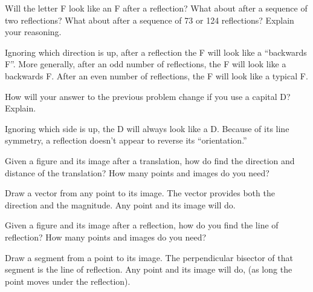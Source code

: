 \documentclass[nooutcomes]{ximera}
\begin{document}
\begin{question}
Will the letter F look like an F after a reflection?  What about after a sequence of two reflections?  What about after a sequence of 73 or 124 reflections?  Explain your reasoning.  
\begin{freeResponse}
\begin{hint}
Ignoring which direction is up, after a reflection the F will look like a ``backwards F''.  More generally, after an odd number of reflections, the F will look like a backwards F.  After an even number of reflections, the F will look like a typical F.  
\end{hint}
\end{freeResponse}
\end{question}

\begin{question}
How will your answer to the previous problem change if you use a capital D?  Explain.  
\begin{freeResponse}
\begin{hint}
Ignoring which side is up, the D will always look like a D.  Because of its line symmetry, a reflection doesn't appear to reverse its ``orientation.''  
\end{hint}
\end{freeResponse}
\end{question}

\begin{question}
Given a figure and its image after a translation, how do find the direction and distance of the translation?    How many points and images do you need?  
\begin{freeResponse}
\begin{hint}
Draw a vector from any point to its image.  The vector provides both the direction and the magnitude.  Any point and its image will do.  
\end{hint}
\end{freeResponse}
\end{question}

\begin{question}
Given a figure and its image after a reflection, how do you find the line of reflection?  How many points and images do you need?  
\begin{freeResponse}
\begin{hint}
Draw a segment from a point to its image.  The perpendicular bisector of that segment is the line of reflection.  Any point and its image will do, (as long the point moves under the reflection).  
\end{hint}
\end{freeResponse}
\end{question}
\end{document}
